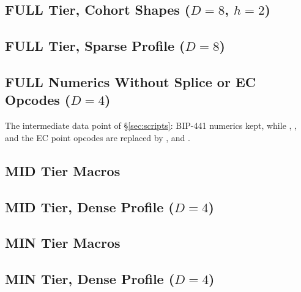 \subsection{FULL Tier, Cohort Shapes ($D = 8$, $h = 2$)}

\subsection{FULL Tier, Sparse Profile ($D = 8$)}

\subsection{FULL Numerics Without Splice or EC Opcodes ($D = 4$)}
The intermediate data point of \S\ref{sec:scripts}: BIP-441 numerics kept,
while , ,  and the EC point opcodes are
replaced by ,  and .

\subsection{MID Tier Macros}\label{app:macros-mid}

\subsection{MID Tier, Dense Profile ($D = 4$)}

\subsection{MIN Tier Macros}\label{app:macros-min}

\subsection{MIN Tier, Dense Profile ($D = 4$)}

